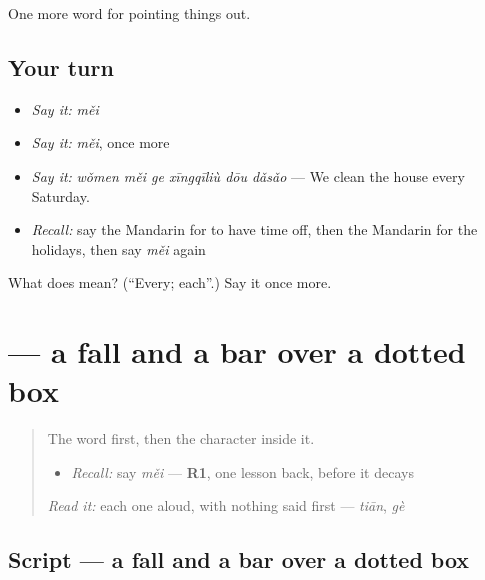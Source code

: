 \begin{grammarlens}[title={What you've built}]
One more word for pointing things out.
\end{grammarlens}

\subsection*{Your turn}
\begin{itemize}
\raggedright
  \item \emph{Say it:} \emph{měi}
  \item \emph{Say it:} \emph{měi}, once more
  \item \emph{Say it:} \emph{wǒmen měi ge xīngqīliù dōu dǎsǎo} — We clean the house every Saturday.
  \item \emph{Recall:} say the Mandarin for to have time off, then the Mandarin for the holidays, then say \emph{měi} again
\end{itemize}

\begin{tcolorbox}[breakable,colback=teal!4,colframe=teal!35!black,title={Before you move on}]
What does  mean? (\textquotedblleft{}Every; each\textquotedblright{}.) Say it once more.
\end{tcolorbox}
\section[\texorpdfstring{\zh{每} (měi)}{每 (měi)}]{ — a fall and a bar over a dotted box}

\label{lesson:ZH-W138-mei-every}



\begin{quote}
The word first, then the character inside it.

\begin{itemize}
\raggedright
  \item \emph{Recall:} say \emph{měi} — \textbf{R1}, one lesson back, before it decays
\end{itemize}

\begin{quote}
 
\end{quote}

\emph{Read it:} each one aloud, with nothing said first — \emph{tiān}, \emph{gè}
\end{quote}

\subsection*{Script — a fall and a bar over a dotted box}

